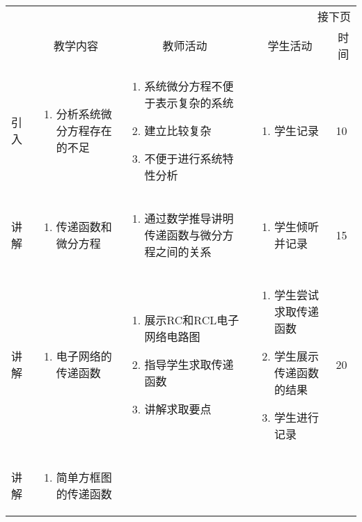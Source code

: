 {\begin{landscape}
\begin{longtable}{|m{10mm}|m{50mm}|m{50mm}|m{50mm}|m{15mm}|}
\multicolumn{5}{r}{\small 接下页}\\
\endfoot
\hline
\endlastfoot
\multicolumn{1}{|c|}{步骤}&\multicolumn{1}{c|}{教学内容}&\multicolumn{1}{c|}{教师活动}&\multicolumn{1}{c|}{学生活动}&\multicolumn{1}{c|}{时间}\\\hline
引入&\begin{enumerate}
\item 分析系统微分方程存在的不足
\end{enumerate} &\begin{enumerate}
\item 系统微分方程不便于表示复杂的系统
\item 建立比较复杂
\item 不便于进行系统特性分析
\end{enumerate} &\begin{enumerate}
\item 学生记录
\end{enumerate} &10 \\\hline
讲解&\begin{enumerate}
\item 传递函数和微分方程
\end{enumerate}
 &\begin{enumerate}
\item 通过数学推导讲明传递函数与微分方程之间的关系
\end{enumerate} &\begin{enumerate}
\item 学生倾听并记录
\end{enumerate} &15 \\\hline
讲解&\begin{enumerate}
\item 电子网络的传递函数
\end{enumerate}
&\begin{enumerate}
\item 展示RC和RCL电子网络电路图
\item 指导学生求取传递函数
\item 讲解求取要点
\end{enumerate} &\begin{enumerate}
\item 学生尝试求取传递函数
\item 学生展示传递函数的结果
\item 学生进行记录
\end{enumerate} &20 \\\hline
讲解&\begin{enumerate}
\item 简单方框图的传递函数

\end{enumerate}
\end{longtable}
\end{landscape}}

